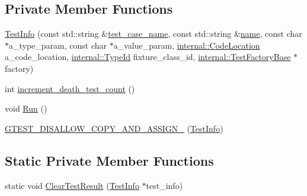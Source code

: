 \subsection*{Private Member Functions}
\begin{DoxyCompactItemize}
\item 
\hyperlink{classtesting_1_1TestInfo_afc4a66e2d2491f09e8549c71514c3d78}{Test\+Info} (const std\+::string \&\hyperlink{classtesting_1_1TestInfo_a036a20710c8c2252889544daba9a8ff9}{test\+\_\+case\+\_\+name}, const std\+::string \&\hyperlink{classtesting_1_1TestInfo_ac2581b45eccc9a3b94cb41c4807d0e34}{name}, const char $\ast$a\+\_\+type\+\_\+param, const char $\ast$a\+\_\+value\+\_\+param, \hyperlink{structtesting_1_1internal_1_1CodeLocation}{internal\+::\+Code\+Location} a\+\_\+code\+\_\+location, \hyperlink{namespacetesting_1_1internal_ab1114197d3c657d8b7f8e0c5caa12d00}{internal\+::\+Type\+Id} fixture\+\_\+class\+\_\+id, \hyperlink{classtesting_1_1internal_1_1TestFactoryBase}{internal\+::\+Test\+Factory\+Base} $\ast$factory)
\item 
int \hyperlink{classtesting_1_1TestInfo_a70c9509202a6f95fbc26704ce13efb63}{increment\+\_\+death\+\_\+test\+\_\+count} ()
\item 
void \hyperlink{classtesting_1_1TestInfo_ade784915e9be3a01e3a6ef509b77d6c9}{Run} ()
\item 
\hyperlink{classtesting_1_1TestInfo_a49607d4547e374b5248e4200d9192817}{G\+T\+E\+S\+T\+\_\+\+D\+I\+S\+A\+L\+L\+O\+W\+\_\+\+C\+O\+P\+Y\+\_\+\+A\+N\+D\+\_\+\+A\+S\+S\+I\+G\+N\+\_\+} (\hyperlink{classtesting_1_1TestInfo}{Test\+Info})
\end{DoxyCompactItemize}
\subsection*{Static Private Member Functions}
\begin{DoxyCompactItemize}
\item 
static void \hyperlink{classtesting_1_1TestInfo_ac6d80865a3e68478aaf167058e6ca5c2}{Clear\+Test\+Result} (\hyperlink{classtesting_1_1TestInfo}{Test\+Info} $\ast$test\+\_\+info)
\end{DoxyCompactItemize}
